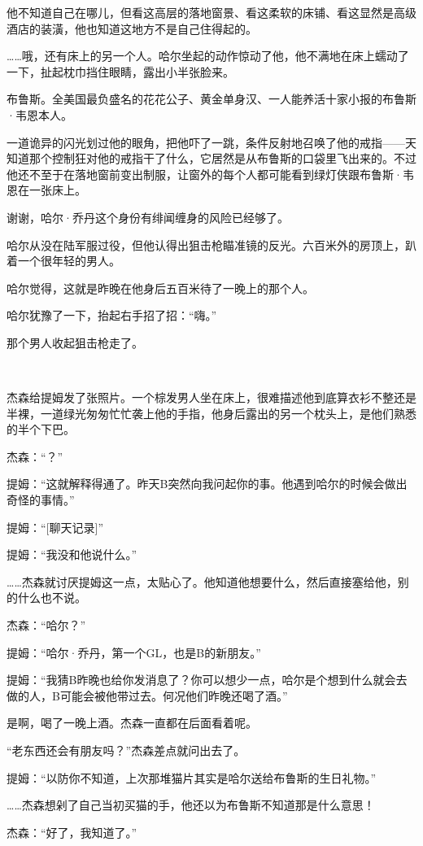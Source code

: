 \documentclass[../main.tex]{subfiles}
\begin{document}
他不知道自己在哪儿，但看这高层的落地窗景、看这柔软的床铺、看这显然是高级酒店的装潢，他也知道这地方不是自己住得起的。

……哦，还有床上的另一个人。哈尔坐起的动作惊动了他，他不满地在床上蠕动了一下，扯起枕巾挡住眼睛，露出小半张脸来。

布鲁斯。全美国最负盛名的花花公子、黄金单身汉、一人能养活十家小报的布鲁斯·韦恩本人。

一道诡异的闪光划过他的眼角，把他吓了一跳，条件反射地召唤了他的戒指——天知道那个控制狂对他的戒指干了什么，它居然是从布鲁斯的口袋里飞出来的。不过他还不至于在落地窗前变出制服，让窗外的每个人都可能看到绿灯侠跟布鲁斯·韦恩在一张床上。

谢谢，哈尔·乔丹这个身份有绯闻缠身的风险已经够了。

哈尔从没在陆军服过役，但他认得出狙击枪瞄准镜的反光。六百米外的房顶上，趴着一个很年轻的男人。

哈尔觉得，这就是昨晚在他身后五百米待了一晚上的那个人。

哈尔犹豫了一下，抬起右手招了招：“嗨。”

那个男人收起狙击枪走了。

~\

杰森给提姆发了张照片。一个棕发男人坐在床上，很难描述他到底算衣衫不整还是半裸，一道绿光匆匆忙忙袭上他的手指，他身后露出的另一个枕头上，是他们熟悉的半个下巴。

杰森：“？”

提姆：“这就解释得通了。昨天B突然向我问起你的事。他遇到哈尔的时候会做出奇怪的事情。”

提姆：“{[}聊天记录{]}”

提姆：“我没和他说什么。”

……杰森就讨厌提姆这一点，太贴心了。他知道他想要什么，然后直接塞给他，别的什么也不说。

杰森：“哈尔？”

提姆：“哈尔·乔丹，第一个GL，也是B的新朋友。”

提姆：“我猜B昨晚也给你发消息了？你可以想少一点，哈尔是个想到什么就会去做的人，B可能会被他带过去。何况他们昨晚还喝了酒。”

是啊，喝了一晚上酒。杰森一直都在后面看着呢。

“老东西还会有朋友吗？”杰森差点就问出去了。

提姆：“以防你不知道，上次那堆猫片其实是哈尔送给布鲁斯的生日礼物。”

……杰森想剁了自己当初买猫的手，他还以为布鲁斯不知道那是什么意思！

杰森：“好了，我知道了。”
\end{document}
